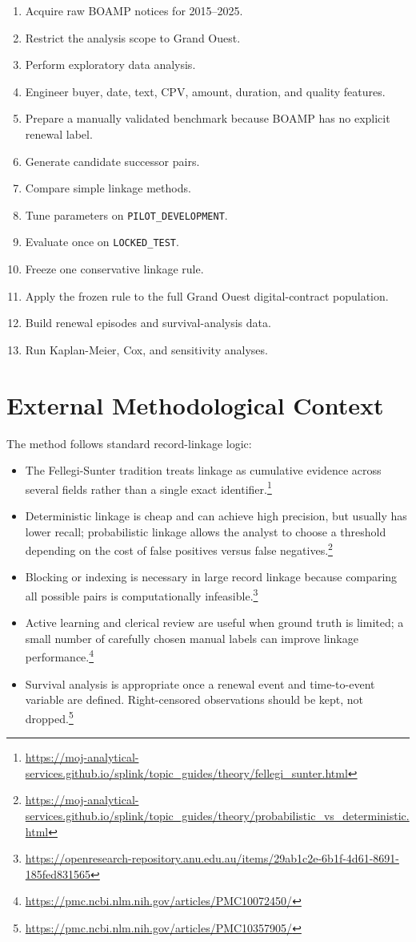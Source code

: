 \documentclass[11pt,a4paper]{article}
\newcommand{\code}[1]{\texttt{#1}}
\begin{document}
\begin{enumerate}
  \item Acquire raw BOAMP notices for 2015--2025.
  \item Restrict the analysis scope to Grand Ouest.
  \item Perform exploratory data analysis.
  \item Engineer buyer, date, text, CPV, amount, duration, and quality features.
  \item Prepare a manually validated benchmark because BOAMP has no explicit renewal label.
  \item Generate candidate successor pairs.
  \item Compare simple linkage methods.
  \item Tune parameters on \code{PILOT\_DEVELOPMENT}.
  \item Evaluate once on \code{LOCKED\_TEST}.
  \item Freeze one conservative linkage rule.
  \item Apply the frozen rule to the full Grand Ouest digital-contract population.
  \item Build renewal episodes and survival-analysis data.
  \item Run Kaplan-Meier, Cox, and sensitivity analyses.
\end{enumerate}

\section*{External Methodological Context}

The method follows standard record-linkage logic:

\begin{itemize}
  \item The Fellegi-Sunter tradition treats linkage as cumulative evidence across several fields rather than a single exact identifier.\footnote{\url{https://moj-analytical-services.github.io/splink/topic_guides/theory/fellegi_sunter.html}}
  \item Deterministic linkage is cheap and can achieve high precision, but usually has lower recall; probabilistic linkage allows the analyst to choose a threshold depending on the cost of false positives versus false negatives.\footnote{\url{https://moj-analytical-services.github.io/splink/topic_guides/theory/probabilistic_vs_deterministic.html}}
  \item Blocking or indexing is necessary in large record linkage because comparing all possible pairs is computationally infeasible.\footnote{\url{https://openresearch-repository.anu.edu.au/items/29ab1c2e-6b1f-4d61-8691-185fed831565}}
  \item Active learning and clerical review are useful when ground truth is limited; a small number of carefully chosen manual labels can improve linkage performance.\footnote{\url{https://pmc.ncbi.nlm.nih.gov/articles/PMC10072450/}}
  \item Survival analysis is appropriate once a renewal event and time-to-event variable are defined. Right-censored observations should be kept, not dropped.\footnote{\url{https://pmc.ncbi.nlm.nih.gov/articles/PMC10357905/}}
\end{itemize}
\end{document}

